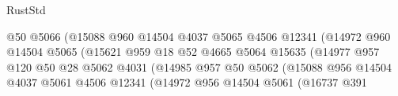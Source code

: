 \begin{lexlean}{RustStd}
\begin{coremodule}
                                              @50
                                              @5066
                                              (@15088
                                                @960
                                                @14504
                                                @4037
                                                @5065
                                                @4506
                                                @12341
                                                (@14972
                                                  @960
                                                  @14504
                                                  @5065
                                                  (@15621
                                                    @959
                                                    @18
                                                    @52
                                                    @4665
                                                    @5064
                                                    @15635
                                                    (@14977
                                                      @957
                                                      @120
                                                      @50
                                                      @28
                                                      @5062
                                                      @4031
                                                      (@14985
                                                        @957
                                                        @50
                                                        @5062
                                                        (@15088
                                                          @956
                                                          @14504
                                                          @4037
                                                          @5061
                                                          @4506
                                                          @12341
                                                          (@14972
                                                            @956
                                                            @14504
                                                            @5061
                                                            (@16737
                                                              @391

\end{coremodule}
\end{lexlean}
